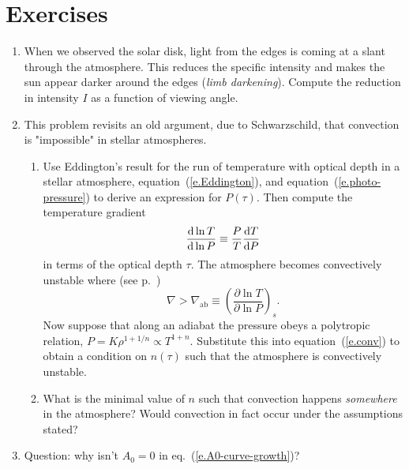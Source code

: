 \section{Exercises}
\begin{enumerate}
\item When we observed the solar disk, light from the edges is coming at a slant through the atmosphere. This reduces the specific intensity and makes the sun appear darker around the edges (\emph{limb darkening}). Compute the reduction in intensity $I$ as a function of viewing angle.

\item This problem revisits an old argument, due to Schwarzschild, that convection is "impossible" in stellar atmospheres.  
\begin{enumerate}
\item Use Eddington's result for the run of temperature with optical depth in a stellar atmosphere, equation~(\ref{e.Eddington}), and equation~(\ref{e.photo-pressure}) 
to derive an expression for $P(\tau)$.  Then compute the temperature gradient
\begin{equation}
\frac{\mathrm{d}\ln T}{\mathrm{d}\ln P} \equiv \frac{P}{T}\frac{\mathrm{d} T}{\mathrm{d} P}
\end{equation}
in terms of the optical depth $\tau$.  The atmosphere becomes convectively unstable where (see p.~\pageref{e.schwarzschild})
\begin{equation}\label{e.conv}
 \nabla > \nabla_{\mathrm{ab}} \equiv \left(\frac{\partial\ln T}{\partial\ln P}\right)_{s}.
\end{equation}
Now suppose that along an adiabat the pressure obeys a polytropic relation, $P = K\rho^{1+1/n} \propto T^{1+n}$. Substitute this into equation~(\ref{e.conv}) to obtain a condition on $n(\tau)$ such that the atmosphere is convectively unstable.

\item What is the minimal value of $n$ such that convection happens \emph{somewhere} in the atmosphere? Would convection in fact occur under the assumptions stated?
\end{enumerate}

\item Question: why isn't $A_{0}=0$ in eq.~(\ref{e.A0-curve-growth})?


\end{enumerate}
